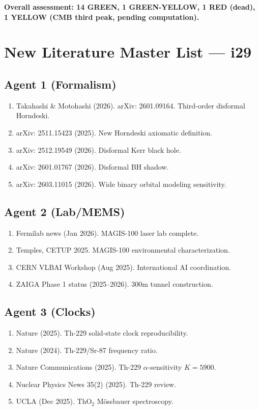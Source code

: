 \documentclass[11pt,a4paper]{article}
\begin{document}
\textbf{Overall assessment: 14 GREEN, 1 GREEN-YELLOW, 1 RED (dead), 1 YELLOW (CMB third peak, pending computation).}

\section{New Literature Master List --- i29}

\subsection{Agent 1 (Formalism)}
\begin{enumerate}
\item Takahashi \& Motohashi (2026). arXiv: 2601.09164. Third-order disformal Horndeski.
\item arXiv: 2511.15423 (2025). New Horndeski axiomatic definition.
\item arXiv: 2512.19549 (2026). Disformal Kerr black hole.
\item arXiv: 2601.01767 (2026). Disformal BH shadow.
\item arXiv: 2603.11015 (2026). Wide binary orbital modeling sensitivity.
\end{enumerate}

\subsection{Agent 2 (Lab/MEMS)}
\begin{enumerate}
\item Fermilab news (Jan 2026). MAGIS-100 laser lab complete.
\item Temples, CETUP 2025. MAGIS-100 environmental characterization.
\item CERN VLBAI Workshop (Aug 2025). International AI coordination.
\item ZAIGA Phase 1 status (2025--2026). 300m tunnel construction.
\end{enumerate}

\subsection{Agent 3 (Clocks)}
\begin{enumerate}
\item Nature (2025). Th-229 solid-state clock reproducibility.
\item Nature (2024). Th-229/Sr-87 frequency ratio.
\item Nature Communications (2025). Th-229 $\alpha$-sensitivity $K = 5900$.
\item Nuclear Physics News 35(2) (2025). Th-229 review.
\item UCLA (Dec 2025). ThO$_2$ M\"{o}ssbauer spectroscopy.
\end{enumerate}
\end{document}
